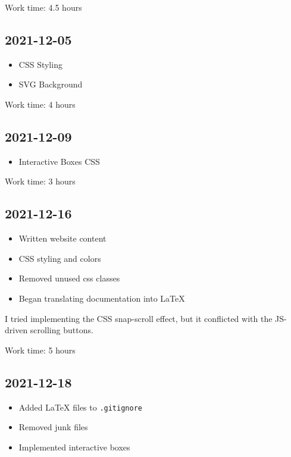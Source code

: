 \documentclass{article}
\begin{document}
Work time: 4.5 hours

\subsection*{2021-12-05}

\begin{itemize}
    \item CSS Styling
    \item SVG Background
\end{itemize}

Work time: 4 hours

\subsection*{2021-12-09}

\begin{itemize}
    \item Interactive Boxes CSS
\end{itemize}

Work time: 3 hours

\subsection*{2021-12-16}

\begin{itemize}
    \item Written website content
    \item CSS styling and colors
    \item Removed unused css classes
    \item Began translating documentation into LaTeX
\end{itemize}

I tried implementing the CSS snap-scroll effect,
but it conflicted with the JS-driven scrolling buttons.

Work time: 5 hours

\subsection*{2021-12-18}

\begin{itemize}
    \item Added LaTeX files to \texttt{.gitignore}
    \item Removed junk files
    \item Implemented interactive boxes
\end{itemize} %
\end{document}
